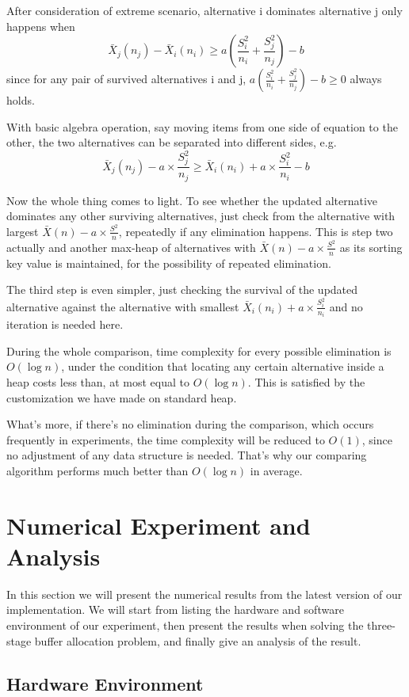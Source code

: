 \documentclass[12pt,a4]{report}
\begin{document}
After consideration of extreme scenario, alternative i dominates alternative j only happens when
$$ \bar{X}_j(n_j)-\bar{X}_i(n_i) \ge a(\frac{S_i^2}{n_i}+\frac{S_j^2}{n_j}) - b $$
since for any pair of survived alternatives i and j, $a(\frac{S_i^2}{n_i}+\frac{S_j^2}{n_j}) - b \ge 0$ always holds.

With basic algebra operation, say moving items from one side of equation to the other, the two alternatives can be separated into different sides, e.g.
$$ \bar{X}_j(n_j) - a \times \frac{S_j^2}{n_j} \ge \bar{X}_i(n_i) + a \times \frac{S_i^2}{n_i} - b $$

Now the whole thing comes to light. To see whether the updated alternative dominates any other surviving alternatives, just check from the alternative with largest $\bar{X}(n) - a \times \frac{S^2}{n}$, repeatedly if any elimination happens. This is step two actually and another max-heap of alternatives with $\bar{X}(n) - a \times \frac{S^2}{n}$ as its sorting key value is maintained, for the possibility of repeated elimination.

The third step is even simpler, just checking the survival of the updated alternative against the alternative with smallest $\bar{X}_i(n_i) + a \times \frac{S_i^2}{n_i}$ and no iteration is needed here.

During the whole comparison, time complexity for every possible elimination is $O(\log n)$, under the condition that locating any certain alternative inside a heap costs less than, at most equal to $O(\log n)$. This is satisfied by the customization we have made on standard heap.

What's more, if there's no elimination during the comparison, which occurs frequently in experiments, the time complexity will be reduced to $O(1)$, since no adjustment of any data structure is needed. That's why our comparing algorithm performs much better than $O(\log n)$ in average.

\chapter{Numerical Experiment and Analysis}

In this section we will present the numerical results from the latest version of our implementation. We will start from listing the hardware and software environment of our experiment, then present the results when solving the three-stage buffer allocation problem, and finally give an analysis of the result.

\section{Hardware Environment}
\end{document}

